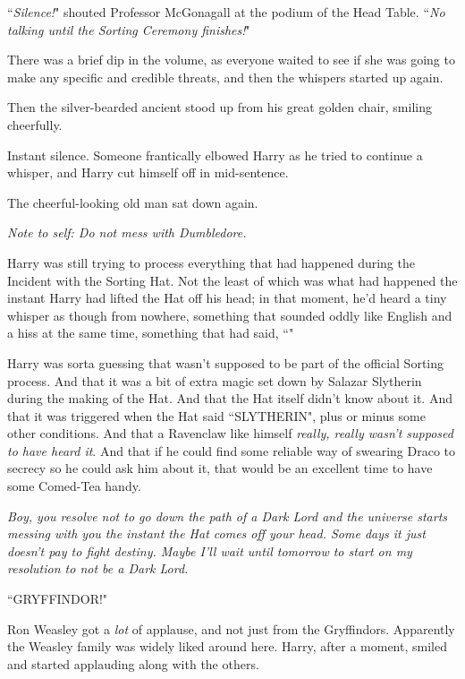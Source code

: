 ``\emph{Silence!}" shouted Professor McGonagall at the podium of the Head Table. ``\emph{No talking until the Sorting Ceremony finishes!}"

There was a brief dip in the volume, as everyone waited to see if she was going to make any specific and credible threats, and then the whispers started up again.

Then the silver-bearded ancient stood up from his great golden chair, smiling cheerfully.

Instant silence. Someone frantically elbowed Harry as he tried to continue a whisper, and Harry cut himself off in mid-sentence.

The cheerful-looking old man sat down again.

\emph{Note to self: Do not mess with Dumbledore.}

Harry was still trying to process everything that had happened during the Incident with the Sorting Hat. Not the least of which was what had happened the instant Harry had lifted the Hat off his head; in that moment, he'd heard a tiny whisper as though from nowhere, something that sounded oddly like English and a hiss at the same time, something that had said, ``"

Harry was sorta guessing that wasn't supposed to be part of the official Sorting process. And that it was a bit of extra magic set down by Salazar Slytherin during the making of the Hat. And that the Hat itself didn't know about it. And that it was triggered when the Hat said ``SLYTHERIN", plus or minus some other conditions. And that a Ravenclaw like himself \emph{really, really wasn't supposed to have heard it}. And that if he could find some reliable way of swearing Draco to secrecy so he could ask him about it, that would be an excellent time to have some Comed-Tea handy.

\emph{Boy, you resolve not to go down the path of a Dark Lord and the universe starts messing with you the instant the Hat comes off your head. Some days it just doesn't pay to fight destiny. Maybe I'll wait until tomorrow to start on my resolution to not be a Dark Lord.}

``GRYFFINDOR!"

Ron Weasley got a \emph{lot} of applause, and not just from the Gryffindors. Apparently the Weasley family was widely liked around here. Harry, after a moment, smiled and started applauding along with the others.

